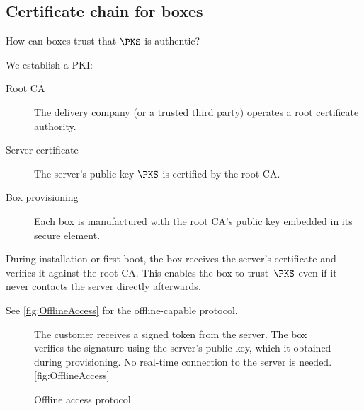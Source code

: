 \subsection{Certificate chain for boxes}

\begin{exercise}
  How can boxes trust that \(\PKS\) is authentic?
\end{exercise}

We establish a \ac{PKI}:
\begin{description}
  \item[Root CA] The delivery company (or a trusted third party) operates
    a root certificate authority.
  \item[Server certificate] The server's public key \(\PKS\) is certified
    by the root CA.
  \item[Box provisioning] Each box is manufactured with the root CA's
    public key embedded in its secure element.
\end{description}

During installation or first boot, the box receives the server's
certificate and verifies it against the root CA.
This enables the box to trust~\(\PKS\) even if it never contacts the
server directly afterwards.

See \cref{fig:OfflineAccess} for the offline-capable protocol.

\begin{figure}
  \begin{sidecaption}{%
    The customer receives a signed token from the server.
    The box verifies the signature using the server's public key, which
    it obtained during provisioning.
    No real-time connection to the server is needed.
  }[fig:OfflineAccess]
  \flushright
  \begin{msc}
    [/msc/action width=0.35\linewidth]
    {Offline access protocol}
      \nextlevel[2]
      \nextlevel[2]
      \nextlevel[3]
      \nextlevel
      \nextlevel
      \nextlevel
  \end{msc}
  \end{sidecaption}
\end{figure}

